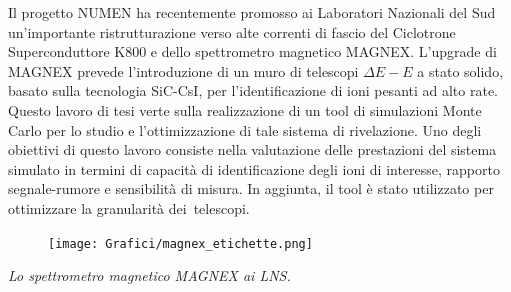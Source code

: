 \documentclass[10pt,foldmark]{leaflet}
\newcommand{\geant}{Geant4}
\begin{document}
Il progetto NUMEN ha recentemente promosso ai Laboratori Nazionali del Sud un'importante ristrutturazione verso alte correnti di fascio del Ciclotrone Superconduttore K800 e dello spettrometro magnetico MAGNEX.
L'upgrade di MAGNEX prevede l'introduzione di un muro di telescopi $\Delta E - E$ a stato solido, basato sulla tecnologia SiC-CsI, per l'identificazione di ioni pesanti ad alto rate.
Questo lavoro di tesi verte sulla realizzazione di un tool di simulazioni Monte Carlo per lo studio e l'ottimizzazione di tale sistema di rivelazione.
Uno degli obiettivi di questo lavoro consiste nella valutazione delle prestazioni del sistema simulato in termini di capacità di identificazione degli ioni di interesse, rapporto segnale-rumore e sensibilità di misura.
In aggiunta, il tool è stato utilizzato per ottimizzare la granularità dei~telescopi.



\begin{figure} [!h]
	\centering
	\texttt{[image: Grafici/magnex\_etichette.png]}
\end{figure}
\hspace{0.8 cm}\textit{ Lo spettrometro magnetico MAGNEX ai LNS.}


\end{document}
